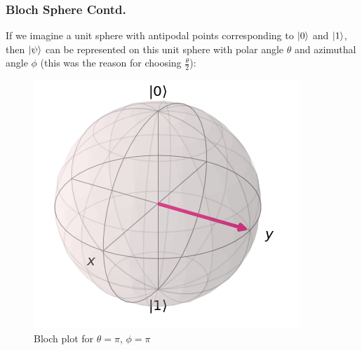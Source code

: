 \documentclass{beamer}
\begin{document}
\begin{frame}
\frametitle{Bloch Sphere Contd.}
If we imagine a unit sphere with antipodal points corresponding to $\ket{0}$ and $\ket{1}$, then $\ket \psi$ can be represented on this unit sphere with polar angle $\theta$ and azimuthal angle $\phi$ (this was the reason for choosing $\frac{\theta}{2}$):
\begin{figure}
\centering
\includegraphics[scale=.4]{scrn-2022-10-04-15-44-49.png}
\caption{Bloch plot for $\theta = \pi$, $\phi = \pi$}
\end{figure}
\end{frame}
\end{document}
